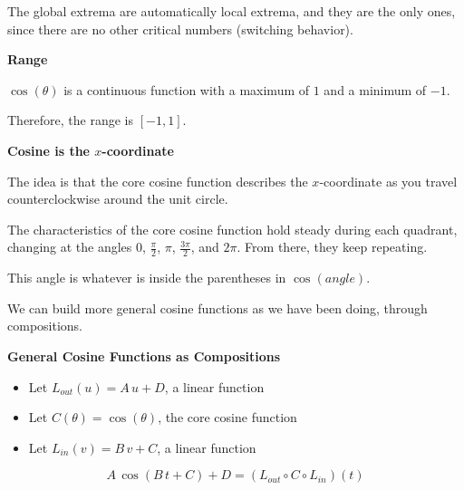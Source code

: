 \documentclass{ximera}
\begin{document}
The global extrema are automatically local extrema, and they are the only ones, since there are no other critical numbers (switching behavior).







\textbf{\textcolor{blue!55!black}{Range}}


$\cos(\theta)$ is a continuous function with a maximum of $1$ and a minimum of $-1$.

Therefore, the range is $[-1,1]$.














\begin{observation} \textbf{\textcolor{-red!75}{Cosine is the $x$-coordinate}}

The idea is that the core cosine function describes the $x$-coordinate as you travel counterclockwise around the unit circle.

The characteristics of the core cosine function hold steady during each quadrant, changing at the angles $0$, $\frac{\pi}{2}$, $\pi$, $\frac{3\pi}{2}$, and $2\pi$. From there, they keep repeating.

This angle is whatever is inside the parentheses in $\cos(angle)$.


\end{observation}








We can build more general cosine functions as we have been doing, through compositions.



\begin{idea} \textbf{\textcolor{blue!55!black}{General Cosine Functions as Compositions}} 


\begin{itemize}
\item Let $L_{out}(u) = A \, u + D$, a linear function
\item Let $C(\theta) = \cos(\theta)$, the core cosine function
\item Let $L_{in}(v) = B \, v + C$, a linear function
\end{itemize}


\[
A \, \cos(B \, t + C) + D = (L_{out} \circ C \circ L_{in})(t)
\]



\end{idea}
\end{document}
